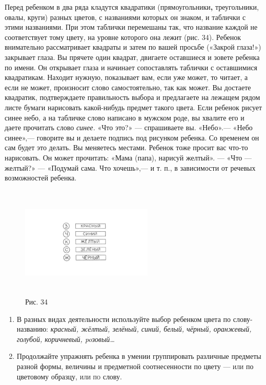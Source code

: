 \documentclass[a5paper]{book}
\renewcommand{\emph}[1]{\textit{#1}}
\begin{document}
Перед ребенком в два ряда кладутся квадратики (прямоугольники\textbf{,}
треугольники, овалы, круги) разных цветов, с названиями которых он
знаком, и таблички с этими названиями. При этом таблички перемешаны так,
что название каждой не соответствует тому цвету, на уровне которого она
лежит (рис. 34). Ребенок внимательно рассматривает квадраты и затем по
вашей просьбе («Закрой глаза!») закрывает глаза. Вы прячете один
квадрат, двигаете оставшиеся и зовете ребенка по имени. Он открывает
глаза и начинает сопоставлять таблички с оставшимися квадратикам.
Находит нужную, показывает вам, если уже может, то читает, а если не
может, произносит слово самостоятельно, так как может. Вы достаете
квадратик, подтверждаете правильность выбора и предлагаете на лежащем
рядом листе бумаги нарисовать какой-нибудь предмет такого цвета. Если
ребенок рисует синее небо, а на табличке слово написано в мужском роде,
вы хвалите его и даете прочитать слово \emph{синее.} «Что это?» ---
спрашиваете вы. «Небо».--- «Небо синее»,--- говорите вы и делаете
подпись под рисунком ребенка. Со временем он сам будет это делать. Вы
меняетесь местами. Ребенок тоже просит вас что-то нарисовать. Он может
прочитать: «Мама (папа), нарисуй желтый». --- «Что --- желтый?» ---
«Подумай сама. Что хочешь»,--- и т. п., в зависимости от речевых
возможностей ребенка.

\begin{figure}
\centering
\includegraphics[width=2.4855in,height=2.12308in]{media/media/image31.png}
\caption*{Рис. 34}
\end{figure}


\begin{enumerate}
\def\labelenumi{\arabic{enumi}.}
\setcounter{enumi}{1}
\item
  
  В разных видах деятельности используйте выбор ребенком цвета по
  слову-названию: \emph{красный, жёлтый, зелёный, синий, белый, чёрный,
  оранжевый, голубой, коричневый, poзовый\ldots{}}
  
\item
  
  Продолжайте упражнять ребенка в умении группировать различные предметы
  разной формы, величины и предметной соотнесенности по цвету ---
  \textsc{или} по цветовому образцу, \textsc{или по} слову.
  
\end{enumerate}
\end{document}
